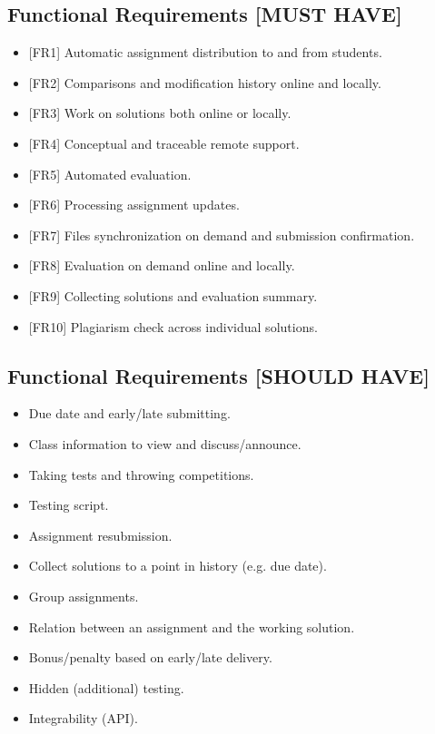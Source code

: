 \subsection{Functional Requirements {[}MUST HAVE{]}} \label{ssec:func-must}

\begin{itemize}
\item
  {{[}FR1{]} Automatic assignment distribution to and from students.}
\item
  {{[}FR2{]} Comparisons and modification history online and locally.}
\item
  {{[}FR3{]} Work on solutions both online or locally.}
\item
  {{[}FR4{]} Conceptual and traceable remote support.}
\item
  {{[}FR5{]} Automated evaluation.}
\item
  {{[}FR6{]} Processing assignment updates.}
\item
  {{[}FR7{]} Files synchronization on demand and submission confirmation.}
\item
  {{[}FR8{]} Evaluation on demand online and locally.}
\item
  {{[}FR9{]} Collecting solutions and evaluation summary.}
\item
  {{[}FR10{]} Plagiarism check across individual solutions.}
\end{itemize}

\subsection{Functional Requirements {[}SHOULD HAVE{]}} \label{ssec:func-should}

\begin{itemize}
\item
  {Due date and early/late submitting.}
\item
  {Class information to view and discuss/announce.}
\item
  {Taking tests and throwing competitions.}
\item
  {Testing script.}
\item
  {Assignment resubmission.}
\item
  {Collect solutions to a point in history (e.g. due date).}
\item
  {Group assignments.}
\item
  {Relation between an assignment and the working solution.}
\item
  {Bonus/penalty based on early/late delivery.}
\item
  {Hidden (additional) testing.}
\item
  {Integrability (API).}
\end{itemize}

